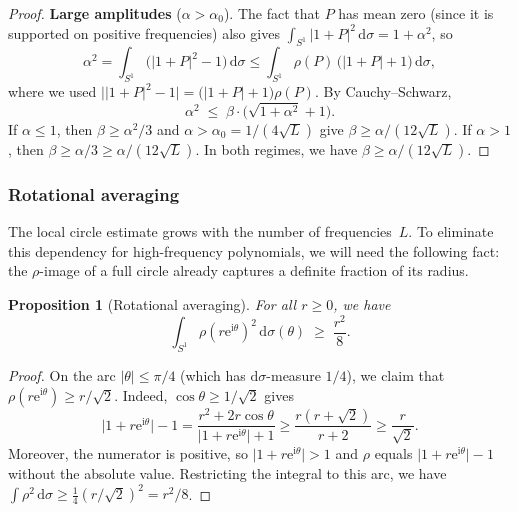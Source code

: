 \documentclass[11pt]{amsart}
\newtheorem{proposition}[theorem]{Proposition}
\theoremstyle{remark}
\begin{document}
\begin{proof}
\medskip
\noindent
\textbf{Large amplitudes} ($\alpha > \alpha_0$).
The fact that $P$ has mean zero (since it is supported on positive frequencies) also gives
$\int_{S^1}\lvert 1+P \rvert^2\,\mathrm{d}\sigma = 1 + \alpha^2$, so
\[
\alpha^2
= \int_{S^1}\bigl(\lvert 1+P \rvert^2 - 1\bigr)\,\mathrm{d}\sigma
\le \int_{S^1} \rho(P)\,\bigl(\lvert 1+P \rvert + 1\bigr)\,\mathrm{d}\sigma,
\]
where we used $\bigl\lvert \lvert 1+P \rvert^2 - 1\bigr\rvert
= \bigl(\lvert 1+P \rvert + 1\bigr)\rho(P)$.  By Cauchy--Schwarz,
\[
\alpha^2 \;\le\; \beta \cdot \bigl(\sqrt{1+\alpha^2} + 1\bigr).
\]
If $\alpha \le 1$, then $\beta \ge \alpha^2/3$ and $\alpha > \alpha_0 = 1/(4\sqrt{L})$ give
$\beta \ge \alpha/(12\sqrt{L})$.
If $\alpha > 1$, then $\beta \ge \alpha/3 \ge \alpha/(12\sqrt{L})$.
In both regimes, we have $\beta \ge \alpha/(12\sqrt{L})$.
\end{proof}


\subsubsection{Rotational averaging}\label{sec:rot-avg}

The local circle estimate grows with the number of frequencies~$L$.  To
eliminate this dependency for high-frequency polynomials, we will need the
following fact: the $\rho$-image of a full circle already captures a
definite fraction of its radius.

\begin{proposition}[Rotational averaging]\label{prop:rot-avg}
For all $r \ge 0$, we have
\[
\int_{S^1} \rho(r\mathrm{e}^{\mathrm{i}\theta})^2\,\mathrm{d}\sigma(\theta)
\;\ge\; \frac{r^2}{8}.
\]
\end{proposition}

\begin{proof}
On the arc $\lvert \theta \rvert \le \pi/4$ (which has $\mathrm{d}\sigma$-measure $1/4$),
we claim that $\rho(r\mathrm{e}^{\mathrm{i}\theta}) \ge r/\sqrt{2}$.  Indeed,
$\cos\theta \ge 1/\sqrt{2}$ gives
\[
\lvert 1 + r\mathrm{e}^{\mathrm{i}\theta} \rvert - 1
= \frac{r^2 + 2r\cos\theta}{\lvert 1+r\mathrm{e}^{\mathrm{i}\theta} \rvert + 1}
\ge \frac{r(r + \sqrt{2})}{r + 2}
\ge \frac{r}{\sqrt{2}}.
\]
  Moreover, the numerator
is positive, so $\lvert 1 + r\mathrm{e}^{\mathrm{i}\theta} \rvert > 1$ and $\rho$ equals
$\lvert 1+r\mathrm{e}^{\mathrm{i}\theta} \rvert - 1$ without the absolute value.  Restricting the
integral to this arc, we have
$\int \rho^2\,\mathrm{d}\sigma \ge \frac{1}{4}(r/\sqrt{2})^2 = r^2/8$.
\end{proof}
\end{document}
